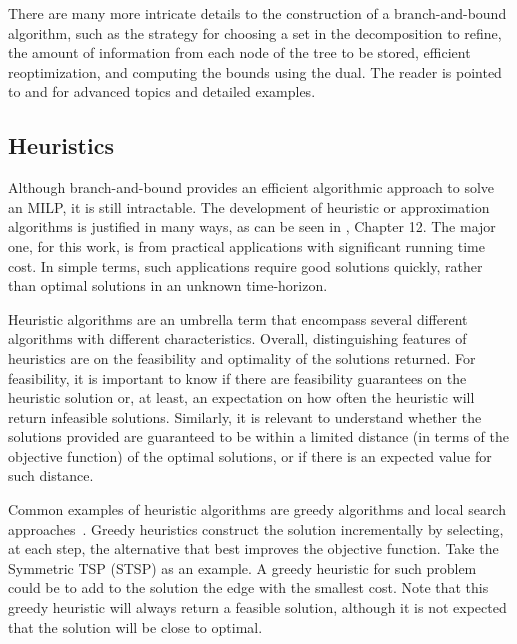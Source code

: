 
There are many more intricate details to the construction of a branch-and-bound algorithm, such as the strategy for choosing a set in the decomposition to refine, the amount of information from each node of the tree to be stored, efficient reoptimization, and computing the bounds using the dual.
The reader is pointed to  and  for advanced topics and detailed examples.


\subsection{Heuristics}

Although branch-and-bound provides an efficient algorithmic approach to solve an MILP, it is still intractable.
The development of heuristic or approximation algorithms is justified in many ways, as can be seen in , Chapter 12.
The major one, for this work, is from practical applications with significant running time cost.
In simple terms, such applications require good solutions quickly, rather than optimal solutions in an unknown time-horizon.

Heuristic algorithms are an umbrella term that encompass several different algorithms with different characteristics.
Overall, distinguishing features of heuristics are on the feasibility and optimality of the solutions returned.
For feasibility, it is important to know if there are feasibility guarantees on the heuristic solution or, at least, an expectation on how often the heuristic will return infeasible solutions.
Similarly, it is relevant to understand whether the solutions provided are guaranteed to be within a limited distance (in terms of the objective function) of the optimal solutions, or if there is an expected value for such distance. 

Common examples of heuristic algorithms are greedy algorithms and local search approaches~\cite{nemhauserIntegerCombinatorialOptimization1999,wolseyIntegerProgramming1998}.
Greedy heuristics construct the solution incrementally by selecting, at each step, the alternative that best improves the objective function.
Take the Symmetric TSP (STSP) as an example.
A greedy heuristic for such problem could be to add to the solution the edge with the smallest cost.
Note that this greedy heuristic will always return a feasible solution, although it is not expected that the solution will be close to optimal.

